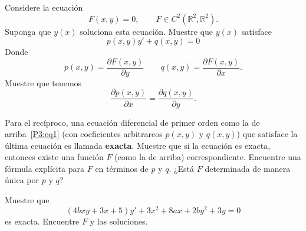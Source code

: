 \begin{problema}
Considere la ecuación
\[
    F(x,y) = 0, \qquad F \in C^2(\mathbb{R}^2, \mathbb{R}^2)
.\]
Suponga que \(y(x)\) soluciona esta ecuación. Muestre que \(y(x)\) satisface
\begin{equation*}\label{P3:eq1}
    p(x,y) y' + q(x,y) = 0 \tag{\(\star\)}
\end{equation*}
Donde
\[
    p(x,y) = \frac{\partial F(x,y)}{\partial y}
    \qquad
    q(x,y) = \frac{\partial F(x,y)}{\partial x}
.\]
Muestre que tenemos
\[
    \frac{\partial p(x,y)}{\partial x}
    =
    \frac{\partial q(x,y)}{\partial y}
.\]

Para el recíproco, una ecuación diferencial de primer orden como la
de arriba~\eqref{P3:eq1} (con coeficientes arbitrareos \(p(x,y)\) y \(q(x,y)\))
que satisface la
última ecuación es llamada \textbf{exacta}. Muestre que si la ecuación es
exacta, entonces existe una función \(F\) (como la de arriba) correspondiente.
Encuentre una fórmula explícita para \(F\) en términos de \(p\) y \(q\). ¿Está
\(F\) determinada de manera única por \(p\) y \(q\)?

Muestre que
\[
    (4bxy + 3x + 5)y' + 3x^2 + 8ax + 2by^2 + 3y = 0
\]
es exacta. Encuentre \(F\) y las soluciones.
\end{problema}
